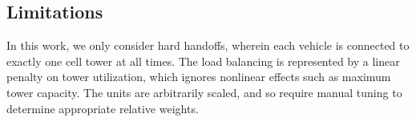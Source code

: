 \subsection{Limitations}
  
In this work, we only consider hard handoffs, wherein each vehicle is connected to exactly one cell tower at all times.  The load balancing is represented by a linear penalty on tower utilization, which ignores nonlinear effects such as maximum tower capacity.  The units are arbitrarily scaled, and so require manual tuning to determine appropriate relative weights.
